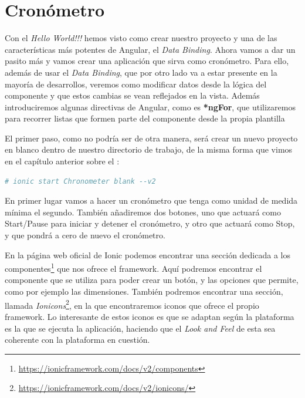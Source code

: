 \clearpage
\section{Cronómetro} \label{sec:crono}

Con el \emph{Hello World!!!} hemos visto como crear nuestro proyecto y una de las características más potentes de Angular, el \emph{Data Binding}. Ahora vamos a dar un pasito más y vamos crear una aplicación que sirva como cronómetro. Para ello, además de usar el \emph{Data Binding}, que por otro lado va a estar presente en la mayoría de desarrollos, veremos como modificar datos desde la lógica del componente y que estos cambias se vean reflejados en la vista. Además introduciremos algunas directivas de Angular, como es \textbf{*ngFor}, que utilizaremos para recorrer listas que formen parte del componente desde la propia plantilla

El primer paso, como no podría ser de otra manera, será crear un nuevo proyecto en blanco dentro de nuestro directorio de trabajo, de la misma forma que vimos en el capítulo anterior sobre el :

\begin{lstlisting}[language=bash]
  # ionic start Chronometer blank --v2
\end{lstlisting}

En primer lugar vamos a hacer un cronómetro que tenga como unidad de medida mínima el segundo. También añadiremos dos botones, uno que actuará como Start/Pause para iniciar y detener el cronómetro, y otro que actuará como Stop, y que pondrá a cero de nuevo el cronómetro.

En la página web oficial de Ionic podemos encontrar una sección dedicada a los componentes\footnote{\url{https://ionicframework.com/docs/v2/components}} que nos ofrece el framework. Aquí podremos encontrar el componente que se utiliza para poder crear un botón, y las opciones que permite, como por ejemplo las dimensiones. También podremos encontrar una sección, llamada \emph{Ionicons}\footnote{\url{https://ionicframework.com/docs/v2/ionicons/}}, en la que encontraremos iconos que ofrece el propio framework. Lo interesante de estos iconos es que se adaptan según la plataforma es la que se ejecuta la aplicación, haciendo que el \emph{Look and Feel} de esta sea coherente con la plataforma en cuestión.


